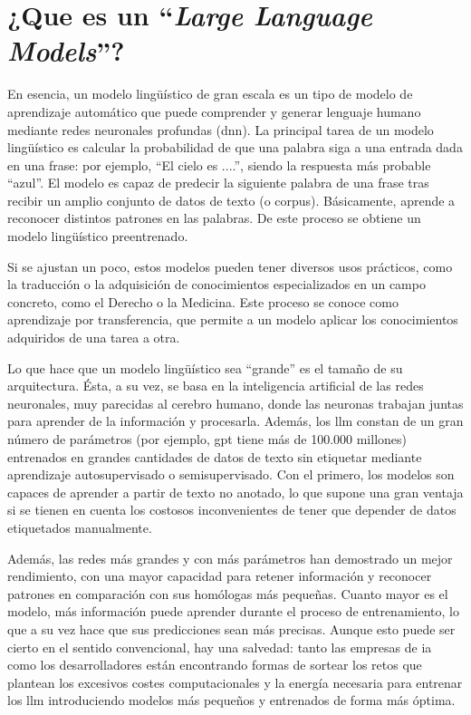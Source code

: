 \section{¿Que es un ``\textit{Large Language Models}''?}

En esencia, un modelo lingüístico de gran escala es un tipo de modelo de aprendizaje automático que puede comprender y generar lenguaje humano mediante redes neuronales profundas (\acrlong{dnn}). La principal tarea de un modelo lingüístico es calcular la probabilidad de que una palabra siga a una entrada dada en una frase: por ejemplo, ``El cielo es ....'', siendo la respuesta más probable ``azul''. El modelo es capaz de predecir la siguiente palabra de una frase tras recibir un amplio conjunto de datos de texto (o corpus). Básicamente, aprende a reconocer distintos patrones en las palabras. De este proceso se obtiene un modelo lingüístico preentrenado.

Si se ajustan un poco, estos modelos pueden tener diversos usos prácticos, como la traducción o la adquisición de conocimientos especializados en un campo concreto, como el Derecho o la Medicina. Este proceso se conoce como aprendizaje por transferencia, que permite a un modelo aplicar los conocimientos adquiridos de una tarea a otra.

Lo que hace que un modelo lingüístico sea ``grande'' es el tamaño de su arquitectura. Ésta, a su vez, se basa en la inteligencia artificial de las redes neuronales, muy parecidas al cerebro humano, donde las neuronas trabajan juntas para aprender de la información y procesarla. Además, los \acrshort{llm} constan de un gran número de parámetros (por ejemplo, \acrshort{gpt} tiene más de 100.000 millones) entrenados en grandes cantidades de datos de texto sin etiquetar mediante aprendizaje autosupervisado o semisupervisado. Con el primero, los modelos son capaces de aprender a partir de texto no anotado, lo que supone una gran ventaja si se tienen en cuenta los costosos inconvenientes de tener que depender de datos etiquetados manualmente.

Además, las redes más grandes y con más parámetros han demostrado un mejor rendimiento, con una mayor capacidad para retener información y reconocer patrones en comparación con sus homólogas más pequeñas. Cuanto mayor es el modelo, más información puede aprender durante el proceso de entrenamiento, lo que a su vez hace que sus predicciones sean más precisas. Aunque esto puede ser cierto en el sentido convencional, hay una salvedad: tanto las empresas de \acrshort{ia} como los desarrolladores están encontrando formas de sortear los retos que plantean los excesivos costes computacionales y la energía necesaria para entrenar los \acrshort{llm} introduciendo modelos más pequeños y entrenados de forma más óptima.

